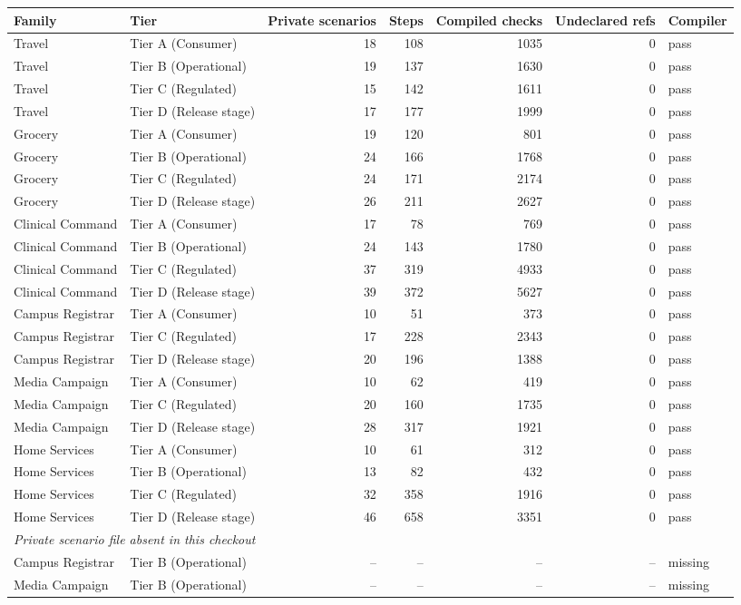 \begin{tabular}{llrrrrl}
\toprule
Family & Tier & Private scenarios & Steps & Compiled checks & Undeclared refs & Compiler \\
\midrule
Travel & Tier A (Consumer) & 18 & 108 & 1035 & 0 & pass \\
Travel & Tier B (Operational) & 19 & 137 & 1630 & 0 & pass \\
Travel & Tier C (Regulated) & 15 & 142 & 1611 & 0 & pass \\
Travel & Tier D (Release stage) & 17 & 177 & 1999 & 0 & pass \\
Grocery & Tier A (Consumer) & 19 & 120 & 801 & 0 & pass \\
Grocery & Tier B (Operational) & 24 & 166 & 1768 & 0 & pass \\
Grocery & Tier C (Regulated) & 24 & 171 & 2174 & 0 & pass \\
Grocery & Tier D (Release stage) & 26 & 211 & 2627 & 0 & pass \\
Clinical Command & Tier A (Consumer) & 17 & 78 & 769 & 0 & pass \\
Clinical Command & Tier B (Operational) & 24 & 143 & 1780 & 0 & pass \\
Clinical Command & Tier C (Regulated) & 37 & 319 & 4933 & 0 & pass \\
Clinical Command & Tier D (Release stage) & 39 & 372 & 5627 & 0 & pass \\
Campus Registrar & Tier A (Consumer) & 10 & 51 & 373 & 0 & pass \\
Campus Registrar & Tier C (Regulated) & 17 & 228 & 2343 & 0 & pass \\
Campus Registrar & Tier D (Release stage) & 20 & 196 & 1388 & 0 & pass \\
Media Campaign & Tier A (Consumer) & 10 & 62 & 419 & 0 & pass \\
Media Campaign & Tier C (Regulated) & 20 & 160 & 1735 & 0 & pass \\
Media Campaign & Tier D (Release stage) & 28 & 317 & 1921 & 0 & pass \\
Home Services & Tier A (Consumer) & 10 & 61 & 312 & 0 & pass \\
Home Services & Tier B (Operational) & 13 & 82 & 432 & 0 & pass \\
Home Services & Tier C (Regulated) & 32 & 358 & 1916 & 0 & pass \\
Home Services & Tier D (Release stage) & 46 & 658 & 3351 & 0 & pass \\
\midrule
\multicolumn{7}{l}{\textit{Private scenario file absent in this checkout}} \\
Campus Registrar & Tier B (Operational) & -- & -- & -- & -- & missing \\
Media Campaign & Tier B (Operational) & -- & -- & -- & -- & missing \\
\bottomrule
\end{tabular}
